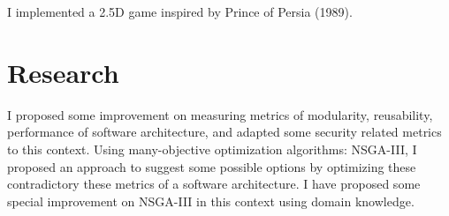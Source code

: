 \documentclass[]{deedy-resume-openfont}
\begin{document}
\begin{minipage}[t]{0.66\textwidth}
I implemented a 2.5D game inspired by Prince of Persia (1989). 
\sectionsep

\section{Research}
I proposed some improvement on measuring metrics of modularity, reusability, performance of software architecture, and adapted some security related metrics  to this context. Using many-objective optimization algorithms: NSGA-III, I proposed an approach to suggest some possible options by optimizing these contradictory these metrics of a software architecture. I have proposed some special  improvement on NSGA-III in this context  using domain knowledge.  



\end{minipage} 
\end{document}
